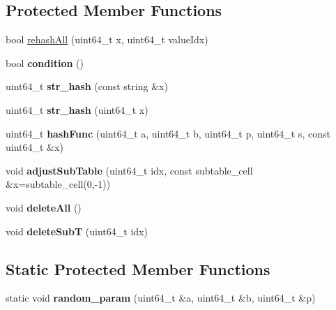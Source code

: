 \subsection*{Protected Member Functions}
\begin{CompactItemize}
\item 
bool \hyperlink{classDynamicPerfectHash_cdbb7a3af80d78ba2e400c531ae8319b}{rehashAll} (uint64\_\-t x, uint64\_\-t valueIdx)
\item 
\hypertarget{classDynamicPerfectHash_ae5fcc786301d81bd59881cdc050f860}{
bool \textbf{condition} ()}
\label{classDynamicPerfectHash_ae5fcc786301d81bd59881cdc050f860}

\item 
\hypertarget{classDynamicPerfectHash_a26c2436d6904064726c08b6a8a33462}{
uint64\_\-t \textbf{str\_\-hash} (const string \&x)}
\label{classDynamicPerfectHash_a26c2436d6904064726c08b6a8a33462}

\item 
\hypertarget{classDynamicPerfectHash_69ab3dcf5a7eabb0f70edd5a079f6c5d}{
uint64\_\-t \textbf{str\_\-hash} (uint64\_\-t x)}
\label{classDynamicPerfectHash_69ab3dcf5a7eabb0f70edd5a079f6c5d}

\item 
\hypertarget{classDynamicPerfectHash_cf4ec08043a93b0e8166c035eb2d0c73}{
uint64\_\-t \textbf{hashFunc} (uint64\_\-t a, uint64\_\-t b, uint64\_\-t p, uint64\_\-t s, const uint64\_\-t \&x)}
\label{classDynamicPerfectHash_cf4ec08043a93b0e8166c035eb2d0c73}

\item 
\hypertarget{classDynamicPerfectHash_2a0c5701a610369dc161daeba71be0b9}{
void \textbf{adjustSubTable} (uint64\_\-t idx, const subtable\_\-cell \&x=subtable\_\-cell(0,-1))}
\label{classDynamicPerfectHash_2a0c5701a610369dc161daeba71be0b9}

\item 
\hypertarget{classDynamicPerfectHash_66e0a5280dea2453fb041bb6dfb6b6dd}{
void \textbf{deleteAll} ()}
\label{classDynamicPerfectHash_66e0a5280dea2453fb041bb6dfb6b6dd}

\item 
\hypertarget{classDynamicPerfectHash_726ca036dba3fb4cf9efb2d7ae894ccf}{
void \textbf{deleteSubT} (uint64\_\-t idx)}
\label{classDynamicPerfectHash_726ca036dba3fb4cf9efb2d7ae894ccf}

\end{CompactItemize}
\subsection*{Static Protected Member Functions}
\begin{CompactItemize}
\item 
\hypertarget{classDynamicPerfectHash_06c1dca453cee284551ecd75fa76c1b1}{
static void \textbf{random\_\-param} (uint64\_\-t \&a, uint64\_\-t \&b, uint64\_\-t \&p)}
\label{classDynamicPerfectHash_06c1dca453cee284551ecd75fa76c1b1}

\end{CompactItemize}
